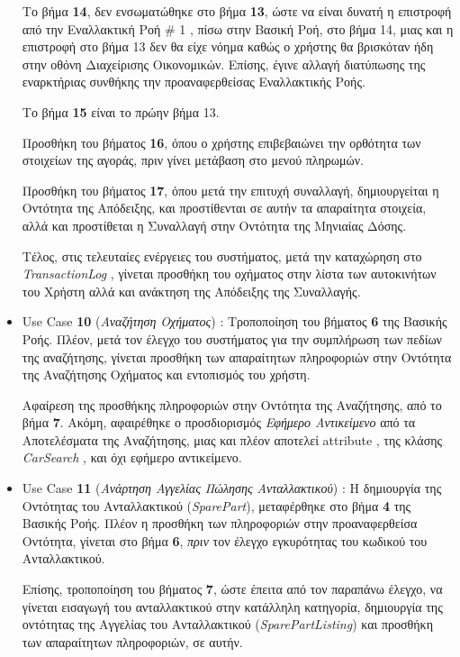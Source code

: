 \documentclass{../ol-softwaremanual}
\begin{document}
\begin{itemize}
		Το βήμα \textbf{14}, δεν ενσωματώθηκε στο βήμα \textbf{13}, ώστε να είναι δυνατή η επιστροφή από την Εναλλακτική Ροή \en \# 1 \gr, πίσω στην Βασική Ροή, στο βήμα 14, μιας και η επιστροφή στο βήμα 13 δεν θα είχε νόημα καθώς ο χρήστης θα βρισκόταν ήδη στην οθόνη Διαχείρισης Οικονομικών. Επίσης, έγινε αλλαγή διατύπωσης της εναρκτήριας συνθήκης την προαναφερθείσας Εναλλακτικής Ροής.
		
		Το βήμα \textbf{15} είναι το πρώην βήμα 13.
		
		Προσθήκη του βήματος \textbf{16}, όπου ο χρήστης επιβεβαιώνει την ορθότητα των στοιχείων της αγοράς, πριν γίνει μετάβαση στο μενού πληρωμών.
		
		Προσθήκη του βήματος \textbf{17}, όπου μετά την επιτυχή συναλλαγή, δημιουργείται η Οντότητα της Απόδειξης, και προστίθενται σε αυτήν τα απαραίτητα στοιχεία, αλλά και προστίθεται η Συναλλαγή στην Οντότητα της Μηνιαίας Δόσης.
		
		Τέλος, στις τελευταίες ενέργειες του συστήματος, μετά την καταχώρηση στο \en \textit{TransactionLog} \gr, γίνεται προσθήκη του οχήματος στην λίστα των αυτοκινήτων του Χρήστη αλλά και ανάκτηση της Απόδειξης της Συναλλαγής.
		
		\item \en Use Case \textbf{10} \gr (\textit{Αναζήτηση Οχήματος}) : Τροποποίηση του βήματος \textbf{6} της Βασικής Ροής. Πλέον, μετά τον έλεγχο του συστήματος για την συμπλήρωση των πεδίων της αναζήτησης, γίνεται προσθήκη των απαραίτητων  πληροφοριών στην Οντότητα της Αναζήτησης Οχήματος και εντοπισμός του χρήστη.
		
		Αφαίρεση της προσθήκης πληροφοριών στην Οντότητα της Αναζήτησης, από το βήμα \textbf{7}. Ακόμη, αφαιρέθηκε ο προσδιορισμός \textit{Εφήμερο Αντικείμενο} από τα Αποτελέσματα της Αναζήτησης, μιας και πλέον αποτελεί \en attribute \gr, της κλάσης \en\textit{CarSearch} \gr, και όχι εφήμερο αντικείμενο.
		
		
		\item \en Use Case \textbf{11} \gr (\textit{Ανάρτηση Αγγελίας Πώλησης Ανταλλακτικού}) : Η δημιουργία της Οντότητας του Ανταλλακτικού (\en \textit{SparePart}\gr), μεταφέρθηκε στο βήμα \textbf{4} της Βασικής Ροής. Πλέον η προσθήκη των πληροφοριών στην προαναφερθείσα Οντότητα, γίνεται στο βήμα \textbf{6}, \textit{πριν} τον έλεγχο εγκυρότητας του κωδικού του Ανταλλακτικού.
		
		Επίσης, τροποποίηση του βήματος \textbf{7}, ώστε έπειτα από τον παραπάνω έλεγχο, να γίνεται εισαγωγή του ανταλλακτικού στην κατάλληλη κατηγορία, δημιουργία της οντότητας της Αγγελίας του Ανταλλακτικού (\en \textit{SparePartListing}\gr) και προσθήκη των απαραίτητων πληροφοριών, σε αυτήν.
		

\end{itemize}
\end{document}
